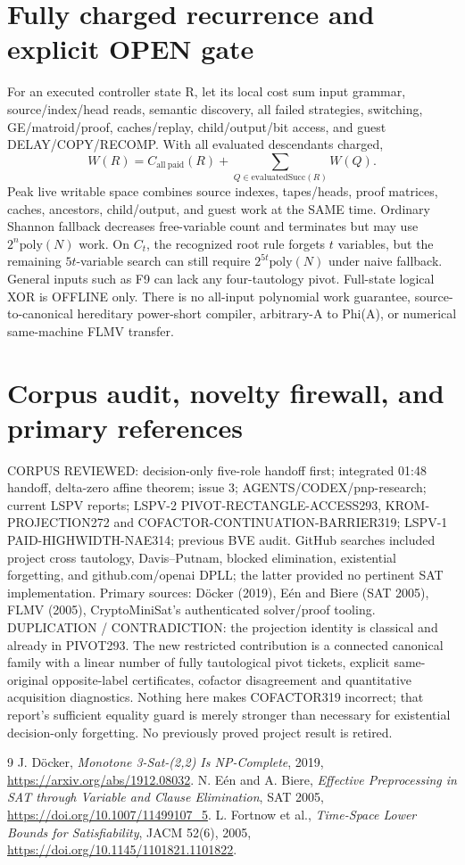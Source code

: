 \documentclass[11pt]{article}
\begin{document}
\section{Fully charged recurrence and explicit OPEN gate}
For an executed controller state R, let its local cost sum input grammar, source/index/head reads, semantic discovery, all failed strategies, switching, GE/matroid/proof, caches/replay, child/output/bit access, and guest DELAY/COPY/RECOMP. With all evaluated descendants charged,
\[
W(R)=C_{\mathrm{all\ paid}}(R)+\sum_{Q\in\mathrm{evaluatedSucc}(R)}W(Q).
\]
Peak live writable space combines source indexes, tapes/heads, proof matrices, caches, ancestors, child/output, and guest work at the SAME time. Ordinary Shannon fallback decreases free-variable count and terminates but may use $2^{n}\mathrm{poly}(N)$ work. On $C_t$, the recognized root rule forgets $t$ variables, but the remaining $5t$-variable search can still require $2^{5t}\mathrm{poly}(N)$ under naive fallback. General inputs such as F9 can lack any four-tautology pivot. Full-state logical XOR is OFFLINE only. There is no all-input polynomial work guarantee, source-to-canonical hereditary power-short compiler, arbitrary-A to Phi(A), or numerical same-machine FLMV transfer.
\section{Corpus audit, novelty firewall, and primary references}
CORPUS REVIEWED: decision-only five-role handoff first; integrated 01:48 handoff, delta-zero affine theorem; issue 3; AGENTS/CODEX/pnp-research; current LSPV reports; LSPV-2 PIVOT-RECTANGLE-ACCESS293, KROM-PROJECTION272 and COFACTOR-CONTINUATION-BARRIER319; LSPV-1 PAID-HIGHWIDTH-NAE314; previous BVE audit. GitHub searches included project cross tautology, Davis--Putnam, blocked elimination, existential forgetting, and github.com/openai DPLL; the latter provided no pertinent SAT implementation. Primary sources: D\"ocker (2019), E\'en and Biere (SAT 2005), FLMV (2005), CryptoMiniSat's authenticated solver/proof tooling.
DUPLICATION / CONTRADICTION: the projection identity is classical and already in PIVOT293. The new restricted contribution is a connected canonical family with a linear number of fully tautological pivot tickets, explicit same-original opposite-label certificates, cofactor disagreement and quantitative acquisition diagnostics. Nothing here makes COFACTOR319 incorrect; that report's sufficient equality guard is merely stronger than necessary for existential decision-only forgetting. No previously proved project result is retired.
\begin{thebibliography}{9}
 J. D\"ocker, \emph{Monotone 3-Sat-(2,2) Is NP-Complete}, 2019, \url{https://arxiv.org/abs/1912.08032}.
 N. E\'en and A. Biere, \emph{Effective Preprocessing in SAT through Variable and Clause Elimination}, SAT 2005, \url{https://doi.org/10.1007/11499107_5}.
 L. Fortnow et al., \emph{Time-Space Lower Bounds for Satisfiability}, JACM 52(6), 2005, \url{https://doi.org/10.1145/1101821.1101822}.
\end{thebibliography}
\end{document}
